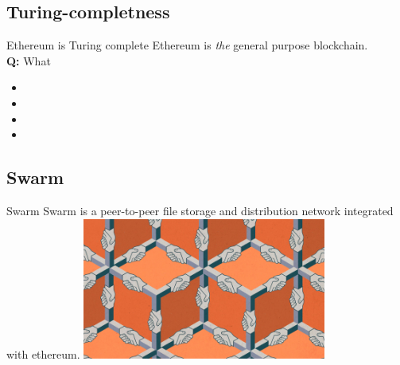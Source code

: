 \documentclass{beamer}
\begin{document}
\subsection[turing]{Turing-completness}
\begin{frame}{Ethereum is Turing complete}
 Ethereum is \textit{the} general purpose blockchain.\\[5mm]
 \textbf{Q:} What 
 

   \begin{itemize}
  \item[Bitcoin] 
  \item[Litecoin] 
  \item[Dogecoin] 
  \item[Ethereum] 
 \end{itemize}

 \end{frame}

 
\subsection[data]{Swarm}
\begin{frame}{Swarm}
Swarm is a peer-to-peer file storage and distribution network integrated with ethereum.
\includegraphics[width=8cm]{peerhandshake.jpg}
\end{frame}
\end{document}
